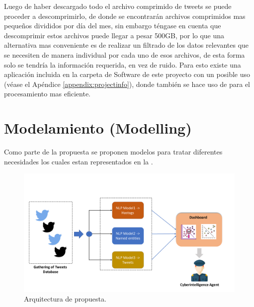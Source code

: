Luego de haber descargado todo el archivo comprimido de tweets se puede proceder a descomprimirlo, de donde se encontrarán archivos comprimidos mas pequeños divididos por día del mes, sin embargo téngase en cuenta que descomprimir estos archivos puede llegar a pesar 500GB, por lo que una alternativa mas conveniente es de realizar un filtrado de los datos relevantes que se necesiten de manera individual por cada uno de esos archivos, de esta forma solo se tendría la información requerida, en vez de ruido. Para esto existe una aplicación incluida en la carpeta de Software de este proyecto con un posible uso (véase el Apéndice \ref{appendix:projectinfo}), donde también se hace uso de \cite{Tange2011a} para el procesamiento mas eficiente.


\section{Modelamiento (Modelling)}
Como parte de la propuesta se proponen \nmodels modelos para tratar diferentes necesidades los cuales estan representados en la .

\begin{figure}[H]
  \centering
  \includegraphics[width=\textwidth]{Figures/general-architecture.pdf}
\decoRule
\caption[Arquitectura de propuesta]{Arquitectura de propuesta.}
\label{fig:proposal-arch}
\end{figure}


